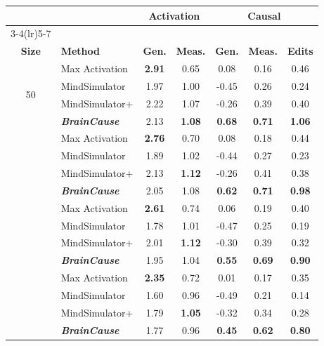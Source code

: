 \documentclass{llmxive}
\begin{document}
\begin{table}[!htbp]
\centering
\setlength{\tabcolsep}{7pt}
\vspace{+0.17cm}
\begin{tabular}{@{}clccccc@{}}
\toprule
& 
& \multicolumn{2}{c}{\textbf{Activation}}
& \multicolumn{3}{c}{\textbf{Causal}} \\
\cmidrule(lr){3-4}\cmidrule(lr){5-7}
\makecell{\textbf{ROI}\\\textbf{Size}}
& \textbf{Method}
& \textbf{Gen.}
& \textbf{Meas.}
& \textbf{Gen.}
& \textbf{Meas.}
& \textbf{Edits} \\
\midrule

\multirow{4}{*}{50}
& Max Activation
& \textbf{2.91} & 0.65 & 0.08 & 0.16 & 0.46 \\
& MindSimulator
& 1.97 & 1.00 & -0.45 & 0.26 & 0.24 \\
& MindSimulator+
& 2.22 & 1.07 & -0.26 & 0.39 & 0.40 \\
& \emph{\textbf{BrainCause}}
& 2.13 & \textbf{1.08} & \textbf{0.68} & \textbf{0.71} & \textbf{1.06} \\

\addlinespace[2pt]
\midrule

\multirow{4}{*}{100}
& Max Activation
& \textbf{2.76} & 0.70 & 0.08 & 0.18 & 0.44 \\
& MindSimulator
& 1.89 & 1.02 & -0.44 & 0.27 & 0.23 \\
& MindSimulator+
& 2.13 & \textbf{1.12} & -0.26 & 0.41 & 0.38 \\
& \emph{\textbf{BrainCause}}
& 2.05 & 1.08 & \textbf{0.62} & \textbf{0.71} & \textbf{0.98} \\

\addlinespace[2pt]
\midrule

\multirow{4}{*}{200}
& Max Activation
& \textbf{2.61} & 0.74 & 0.06 & 0.19 & 0.40 \\
& MindSimulator
& 1.78 & 1.01 & -0.47 & 0.25 & 0.19 \\
& MindSimulator+
& 2.01 & \textbf{1.12} & -0.30 & 0.39 & 0.32 \\
& \emph{\textbf{BrainCause}}
& 1.95 & 1.04 & \textbf{0.55} & \textbf{0.69} & \textbf{0.90} \\

\addlinespace[2pt]
\midrule

\multirow{4}{*}{500}
& Max Activation
& \textbf{2.35} & 0.72 & 0.01 & 0.17 & 0.35 \\
& MindSimulator
& 1.60 & 0.96 & -0.49 & 0.21 & 0.14 \\
& MindSimulator+
& 1.79 & \textbf{1.05} & -0.32 & 0.34 & 0.28 \\
& \emph{\textbf{BrainCause}}
& 1.77 & 0.96 & \textbf{0.45} & \textbf{0.62} & \textbf{0.80} \\


\end{tabular}
\end{table}
\end{document}
